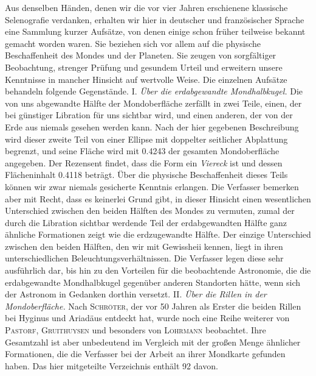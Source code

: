 Aus denselben Händen, denen wir die vor vier Jahren erschienene klassische Selenografie verdanken, erhalten wir hier in deutscher und französischer Sprache eine Sammlung kurzer Aufsätze, von denen einige schon früher teilweise bekannt gemacht worden waren. Sie beziehen sich vor allem auf die physische Beschaffenheit des Mondes und der Planeten. Sie zeugen von sorgfältiger Beobachtung, strenger Prüfung und gesundem Urteil und erweitern unsere Kenntnisse in mancher Hinsicht auf wertvolle Weise. Die einzelnen Aufsätze behandeln folgende Gegenstände.
I. \emph{Über die erdabgewandte Mondhalbkugel.} Die von uns abgewandte Hälfte der Mondoberfläche zerfällt in zwei Teile, einen, der bei günstiger Libration für uns sichtbar wird, und einen anderen, der von der Erde aus niemals gesehen werden kann. Nach der hier gegebenen Beschreibung wird dieser zweite Teil von einer Ellipse mit doppelter seitlicher Abplattung begrenzt, und seine Fläche wird mit 0.4243 der gesamten Mondoberfläche angegeben. Der Rezensent findet, dass die Form ein \emph{Viereck} ist und dessen Flächeninhalt 0.4118 beträgt. Über die physische Beschaffenheit dieses Teils können wir zwar niemals gesicherte Kenntnis erlangen. Die Verfasser bemerken aber mit Recht, dass es keinerlei Grund gibt, in dieser Hinsicht einen wesentlichen Unterschied zwischen den beiden Hälften des Mondes zu vermuten, zumal der durch die Libration sichtbar werdende Teil der erdabgewandten Hälfte ganz ähnliche Formationen zeigt wie die erdzugewandte Hälfte. Der einzige Unterschied zwischen den beiden Hälften, den wir mit Gewissheii kennen, liegt in ihren unterschiedlichen Beleuchtungsverhältnissen. Die Verfasser legen diese sehr ausführlich dar, bis hin zu den Vorteilen für die beobachtende Astronomie, die die erdabgewandte Mondhalbkugel gegenüber anderen Standorten hätte, wenn sich der Astronom in Gedanken dorthin versetzt.
II. \emph{Über die Rillen in der Mondoberfläche.} Nach \textsc{Schröter}, der vor 50 Jahren als Erster die beiden Rillen bei Hyginus und Ariadäus entdeckt hat, wurde noch eine Reihe weiterer von \textsc{Pastorf}, \textsc{Gruithuysen} und besonders von \textsc{Lohrmann} beobachtet. Ihre Gesamtzahl ist aber unbedeutend im Vergleich mit der großen Menge ähnlicher Formationen, die die Verfasser bei der Arbeit an ihrer Mondkarte gefunden haben. Das hier mitgeteilte Verzeichnis enthält 92 davon.
